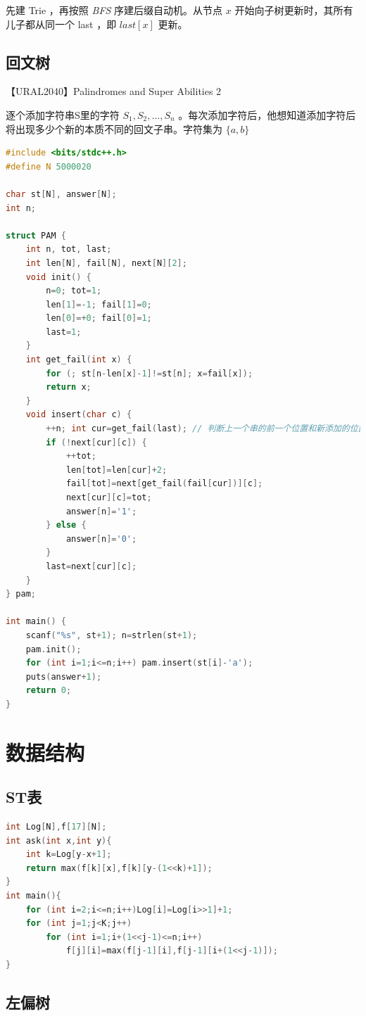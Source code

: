 \documentclass{article}
\begin{document}
先建 Trie ，再按照 \emph{BFS} 序建后缀自动机。从节点 $x$ 开始向子树更新时，其所有儿子都从同一个 last ，即 $last[x]$ 更新。

\subsection{回文树}

【URAL2040】Palindromes and Super Abilities 2

逐个添加字符串S里的字符 $S_1, S_2, ..., S_n$ 。每次添加字符后，他想知道添加字符后将出现多少个新的本质不同的回文子串。字符集为 $\{a, b\}$

\begin{lstlisting}[language=C++]
#include <bits/stdc++.h>
#define N 5000020

char st[N], answer[N];
int n;
 
struct PAM {
	int n, tot, last;
	int len[N], fail[N], next[N][2];
	void init() {
		n=0; tot=1;
		len[1]=-1; fail[1]=0;
		len[0]=+0; fail[0]=1;
		last=1;
	}
	int get_fail(int x) {
		for (; st[n-len[x]-1]!=st[n]; x=fail[x]);
		return x;
	}
	void insert(char c) {
		++n; int cur=get_fail(last); // 判断上一个串的前一个位置和新添加的位置是否相同，相同则说明构成回文。否则找 fail 指针。
		if (!next[cur][c]) {
			++tot;
			len[tot]=len[cur]+2;
			fail[tot]=next[get_fail(fail[cur])][c];
			next[cur][c]=tot;
			answer[n]='1';
		} else {
			answer[n]='0';
		}
		last=next[cur][c];
	}
} pam;
 
int main() {
	scanf("%s", st+1); n=strlen(st+1);
	pam.init();
	for (int i=1;i<=n;i++) pam.insert(st[i]-'a');
	puts(answer+1);
	return 0;
}
\end{lstlisting}

\section{数据结构}
\subsection{ST表}
\begin{lstlisting}[language=C++]
int Log[N],f[17][N];
int ask(int x,int y){
	int k=Log[y-x+1];
	return max(f[k][x],f[k][y-(1<<k)+1]);
}
int main(){
	for (int i=2;i<=n;i++)Log[i]=Log[i>>1]+1;
	for (int j=1;j<K;j++)
		for (int i=1;i+(1<<j-1)<=n;i++)
			f[j][i]=max(f[j-1][i],f[j-1][i+(1<<j-1)]);
}
\end{lstlisting}
\subsection{左偏树}
\end{document}
